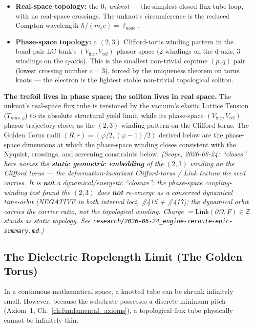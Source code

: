 \begin{itemize}
    \item \textbf{Real-space topology:} the $0_1$ \emph{unknot} --- the simplest closed flux-tube loop, with no real-space crossings. The unknot's circumference is the reduced Compton wavelength $\hbar/(m_e c) = \ell_{node}$.
    \item \textbf{Phase-space topology:} a $(2, 3)$ Clifford-torus winding pattern in the bond-pair LC tank's $(V_{\text{inc}}, V_{\text{ref}})$ phasor space (2 windings on the d-axis, 3 windings on the q-axis). This is the smallest non-trivial coprime $(p, q)$ pair (lowest crossing number $c = 3$), forced by the uniqueness theorem on torus knots --- the electron is the lightest stable non-trivial topological soliton.
\end{itemize}

\textbf{The trefoil lives in phase space; the soliton lives in real space.} The unknot's real-space flux tube is tensioned by the vacuum's elastic Lattice Tension ($T_{max,g}$) to its absolute structural yield limit, while its phase-space $(V_{\text{inc}}, V_{\text{ref}})$ phasor trajectory closes as the $(2, 3)$ winding pattern on the Clifford torus. The Golden Torus radii $(R, r) = (\varphi/2, (\varphi-1)/2)$ derived below are the phase-space dimensions at which the phase-space winding closes consistent with the Nyquist, crossings, and screening constraints below. \emph{(Scope, 2026-06-24: ``closes'' here names the \textbf{static geometric embedding} of the $(2,3)$ winding on the Clifford torus --- the deformation-invariant Clifford-torus / Link texture the seed carries. It is \textbf{not} a dynamical/energetic ``closure'': the phase-space coupling-winding test found the $(2,3)$ does \textbf{not} re-emerge as a conserved dynamical time-orbit (NEGATIVE in both internal loci, \#415 + \#417); the dynamical orbit carries the carrier ratio, not the topological winding. Charge $= \mathrm{Link}(\partial\Omega, F) \in \mathbb{Z}$ stands as static topology. See \texttt{research/2026-06-24\_engine-reroute-epic-summary.md}.)}

\subsection{The Dielectric Ropelength Limit (The Golden Torus)}
\label{sec:golden_torus}

In a continuous mathematical space, a knotted tube can be shrunk infinitely small. However, because the substrate possesses a discrete minimum pitch (Axiom~1, Ch.~\ref{ch:fundamental_axioms}), a topological flux tube physically cannot be infinitely thin.

